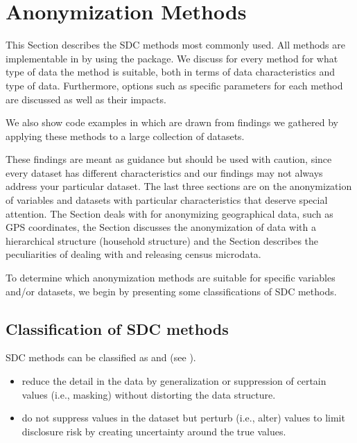 \documentclass[letterpaper,10pt,english]{sphinxmanual}
\begin{document}
\chapter{Anonymization Methods}
\label{\detokenize{anon_methods:anonymization-methods}}\label{\detokenize{anon_methods::doc}}
This Section describes the SDC methods most commonly used. All methods
are implementable in  by using the  package. We discuss for
every method for what type of data the method is suitable, both in terms
of data characteristics and type of data. Furthermore, options such as
specific parameters for each method are discussed as well as their
impacts. %
\begin{footnote}[1]\sphinxAtStartFootnote
We also show code examples in  which are drawn from findings we
gathered by applying these methods to a large collection of datasets.
%
\end{footnote} These findings are meant as guidance but
should be used with caution, since every dataset has different
characteristics and our findings may not always address your particular
dataset. The last three sections are on the
anonymization of variables and datasets with particular characteristics
that deserve special attention. The Section
{\hyperref[\detokenize{anon_methods:anonymization-of-geospatial-variables}]{}}
deals with for anonymizing
geographical data, such as GPS coordinates, the Section
{\hyperref[\detokenize{anon_methods:anonymization-of-the-quasi-identifier-household-size}]{}} discusses the
anonymization of data with a hierarchical structure (household
structure) and the Section
{\hyperref[\detokenize{anon_methods:special-case-census-data}]{}} describes the peculiarities of dealing with
and releasing census microdata.

To determine which anonymization methods are suitable for specific
variables and/or datasets, we begin by presenting some classifications
of SDC methods.


\section{Classification of SDC methods}
\label{\detokenize{anon_methods:classification-of-sdc-methods}}
SDC methods can be classified as  and
 (see {\hyperref[\detokenize{anon_methods:hdfg12}]{}}).
\begin{itemize}
\item {} 
 reduce the detail in the data by
generalization or suppression of certain values (i.e., masking)
without distorting the data structure.

\item {} 
 do not suppress values in the dataset but
perturb (i.e., alter) values to limit disclosure risk by creating
uncertainty around the true values.

\end{itemize}
\end{document}
